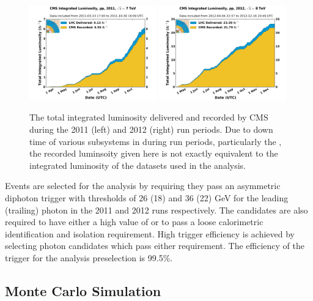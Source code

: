 \begin{figure}
  \includegraphics[width=0.49\textwidth]{analysis_comps/plots/int_lumi_2011.pdf}
  \includegraphics[width=0.49\textwidth]{analysis_comps/plots/int_lumi_2012.pdf}
  \caption[The total integrated luminosity delivered and recorded by \acs{CMS} during the 2011 and 2012 run periods]{The total integrated luminosity delivered and recorded by CMS during the 2011 (left) and 2012 (right) run periods. Due to down time of various subsystems in \CMS during run periods, particularly the \ECAL, the recorded luminsoity given here is not exactly equivalent to the integrated luminosity of the datasets used in the analysis.}
  \label{fig:intlumi}
\end{figure}

Events are selected for the analysis by requiring they pass an asymmetric diphoton trigger with \ET thresholds of 26 (18) and 36 (22) GeV for the leading (trailing) photon in the 2011 and 2012 runs respectively. The candidates are also required to have either a high value of \rnine or to pass a loose calorimetric identification and isolation requirement. High trigger efficiency is achieved by selecting photon candidates which pass either requirement. The efficiency of the trigger for the analysis preselection is 99.5\%.

\subsection{Monte Carlo Simulation}
\label{sec:mc}

